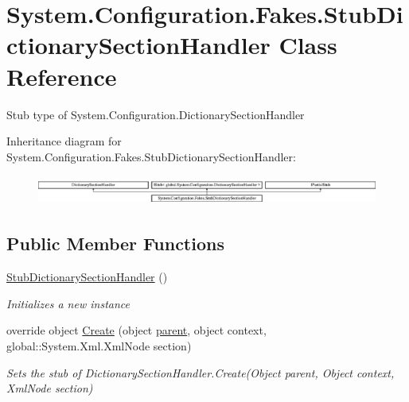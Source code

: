 \hypertarget{class_system_1_1_configuration_1_1_fakes_1_1_stub_dictionary_section_handler}{\section{System.\-Configuration.\-Fakes.\-Stub\-Dictionary\-Section\-Handler Class Reference}
\label{class_system_1_1_configuration_1_1_fakes_1_1_stub_dictionary_section_handler}
}


Stub type of System.\-Configuration.\-Dictionary\-Section\-Handler 


Inheritance diagram for System.\-Configuration.\-Fakes.\-Stub\-Dictionary\-Section\-Handler\-:\begin{figure}[H]
\begin{center}
\leavevmode
\includegraphics[height=0.985048cm]{class_system_1_1_configuration_1_1_fakes_1_1_stub_dictionary_section_handler}
\end{center}
\end{figure}
\subsection*{Public Member Functions}
\begin{DoxyCompactItemize}
\item 
\hyperlink{class_system_1_1_configuration_1_1_fakes_1_1_stub_dictionary_section_handler_a47e146a8138d6ac587ace7b4f9a0d1c1}{Stub\-Dictionary\-Section\-Handler} ()
\begin{DoxyCompactList}\small\item\em Initializes a new instance\end{DoxyCompactList}\item 
override object \hyperlink{class_system_1_1_configuration_1_1_fakes_1_1_stub_dictionary_section_handler_a0348fc0c4c5773f09d5342cca699e8ec}{Create} (object \hyperlink{jquery-1_810_82-vsdoc_8js_aed9b5e7a755bcccb282f9b06c00a6822}{parent}, object context, global\-::\-System.\-Xml.\-Xml\-Node section)
\begin{DoxyCompactList}\small\item\em Sets the stub of Dictionary\-Section\-Handler.\-Create(\-Object parent, Object context, Xml\-Node section)\end{DoxyCompactList}\end{DoxyCompactItemize}
